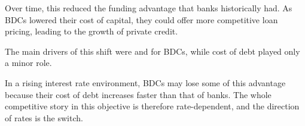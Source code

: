 Over time, this reduced the funding advantage that banks historically had. As BDCs lowered
their cost of capital, they could offer more competitive loan pricing, leading to the growth
of private credit.

The main drivers of this shift were  and  for
BDCs, while cost of debt played only a minor role.

\begin{citrapbox}[title={The condition under which the advantage reverses}]
In a rising interest rate environment, BDCs may lose some of this advantage because their cost
of debt increases faster than that of banks. The whole competitive story in this objective is
therefore rate-dependent, and the direction of rates is the switch.
\end{citrapbox}
